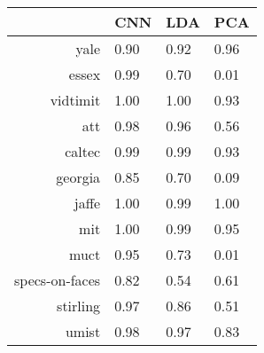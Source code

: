 \begin{tabular}{|r|l|l|l|}
  \hline
    & CNN & LDA & PCA \\
  \hline
  yale & 0.90 & 0.92 & 0.96 \\
  \hline
  essex & 0.99 & 0.70 & 0.01 \\
  \hline
  vidtimit & 1.00 & 1.00 & 0.93 \\
  \hline
  att & 0.98 & 0.96 & 0.56 \\
  \hline
  caltec & 0.99 & 0.99 & 0.93 \\
  \hline
  georgia & 0.85 & 0.70 & 0.09 \\
  \hline
  jaffe & 1.00 & 0.99 & 1.00 \\
  \hline
  mit & 1.00 & 0.99 & 0.95 \\
  \hline
  muct & 0.95 & 0.73 & 0.01 \\
  \hline
  specs-on-faces & 0.82 & 0.54 & 0.61 \\
  \hline
  stirling & 0.97 & 0.86 & 0.51 \\
  \hline
  umist & 0.98 & 0.97 & 0.83 \\
  \hline
\end{tabular}
